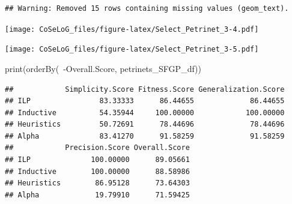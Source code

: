\documentclass[]{article}
\newenvironment{Shaded}{\begin{snugshade}}{\end{snugshade}}
\newcommand{\KeywordTok}[1]{\textcolor[rgb]{0.94,0.87,0.69}{{#1}}}
\newcommand{\DataTypeTok}[1]{\textcolor[rgb]{0.87,0.87,0.75}{{#1}}}
\newcommand{\FloatTok}[1]{\textcolor[rgb]{0.75,0.75,0.82}{{#1}}}
\newcommand{\StringTok}[1]{\textcolor[rgb]{0.80,0.58,0.58}{{#1}}}
\newcommand{\OtherTok}[1]{\textcolor[rgb]{0.94,0.94,0.56}{{#1}}}
\newcommand{\NormalTok}[1]{\textcolor[rgb]{0.80,0.80,0.80}{{#1}}}
\begin{document}
\begin{verbatim}
## Warning: Removed 15 rows containing missing values (geom_text).
\end{verbatim}

\texttt{[image: CoSeLoG\_files/figure-latex/Select\_Petrinet\_3-4.pdf]}

\begin{Shaded}
\end{Shaded}

\texttt{[image: CoSeLoG\_files/figure-latex/Select\_Petrinet\_3-5.pdf]}

\begin{Shaded}
\begin{Highlighting}[]
\KeywordTok{print}\NormalTok{(}\KeywordTok{orderBy}\NormalTok{(~-Overall.Score, petrinets_SFGP_df))}
\end{Highlighting}
\end{Shaded}

\begin{verbatim}
##            Simplicity.Score Fitness.Score Generalization.Score
## ILP                83.33333      86.44655             86.44655
## Inductive          54.35944     100.00000            100.00000
## Heuristics         50.72691      78.44696             78.44696
## Alpha              83.41270      91.58259             91.58259
##            Precision.Score Overall.Score
## ILP              100.00000      89.05661
## Inductive        100.00000      88.58986
## Heuristics        86.95128      73.64303
## Alpha             19.79910      71.59425
\end{verbatim}
\end{document}
